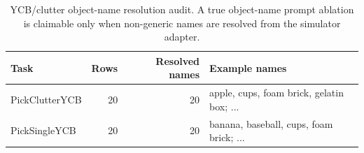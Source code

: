\begin{table}[t]
\centering
\caption{YCB/clutter object-name resolution audit. A true object-name prompt ablation is claimable only when non-generic names are resolved from the simulator adapter.}
\label{tab:target-name-probe}
\scriptsize
\begin{tabular}{lrrl}
\toprule
Task & Rows & Resolved names & Example names \\
\midrule
PickClutterYCB & 20 & 20 & apple, cups, foam brick, gelatin box; ... \\
PickSingleYCB & 20 & 20 & banana, baseball, cups, foam brick; ... \\
\bottomrule
\end{tabular}
\end{table}
